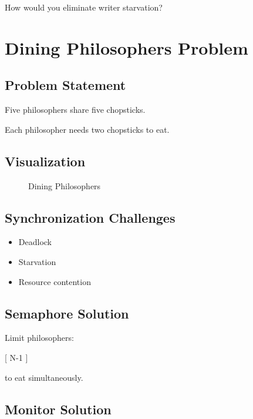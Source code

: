 How would you eliminate writer starvation?

\section{Dining Philosophers Problem}

\subsection{Problem Statement}

Five philosophers share five chopsticks.

Each philosopher needs two chopsticks to eat.

\subsection{Visualization}

\begin{figure}[H]
\centering
{}
\caption{Dining Philosophers}
\end{figure}

\subsection{Synchronization Challenges}

\begin{itemize}
\item Deadlock
\item Starvation
\item Resource contention
\end{itemize}

\subsection{Semaphore Solution}

Limit philosophers:

[
N-1
]

to eat simultaneously.

\subsection{Monitor Solution}

